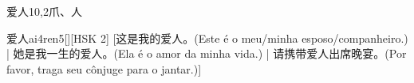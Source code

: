 \begin{entry}{爱人}{10,2}{⽖、⼈}
  \begin{phonetics}{爱人}{ai4ren5}[][HSK 2]
    [这是我的爱人。(Este é o meu/minha esposo/companheiro.) | 她是我一生的爱人。(Ela é o amor da minha vida.) | 请携带爱人出席晚宴。(Por favor, traga seu cônjuge para o jantar.)]
  \end{phonetics}
\end{entry}
